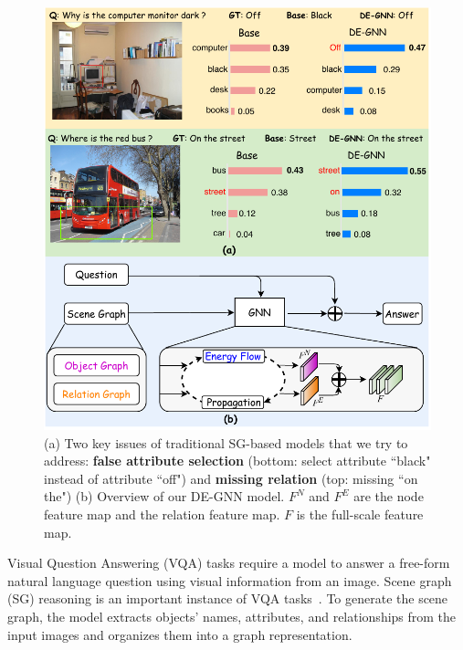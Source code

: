 \documentclass[letterpaper]{article} %
\begin{document}
\begin{figure}[ht] 
    \centering 
    \includegraphics[scale=0.6]{./pic/intro5.pdf} 
    \caption{(a) Two key issues of traditional SG-based models that we try to address: \textbf{false attribute selection} (bottom: select attribute ``black" instead of attribute ``off") and \textbf{missing relation} (top: missing ``on the") (b) Overview of our DE-GNN model. $F^N$ and $F^E$ are the node feature map and the relation feature map. $F$ is the full-scale feature map.} 
    \label{scene-graph} 
    \vspace{-0.1in}
\end{figure}

 Visual Question Answering (VQA) tasks require a model to answer a free-form natural language question using visual information from an image. Scene graph (SG) reasoning is an important instance of VQA tasks~\cite{DBLP:journals/corr/abs-2007-01072}. 
To generate the scene graph, the model extracts objects' names, attributes, and relationships from the input images and organizes them into a graph representation.
\end{document}
